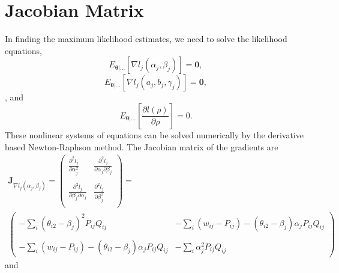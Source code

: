 \documentclass[doc]{apa7}
\begin{document}
  \section{Jacobian Matrix}
  In finding the maximum likelihood estimates, we need to solve the
  likelihood equations,
  \begin{equation}
    E_{\bm{\theta}|\dots}\left[\nabla l_j(\alpha_j, \beta_j)\right] = \bm{0},
  \end{equation}
  \begin{equation}
    E_{\bm{\theta}|\dots}\left[\nabla l_j(a_j, b_j, \gamma_j)\right] = \bm{0},
  \end{equation},
  and
  \begin{equation}
    E_{\bm{\theta}|\dots}\left[\frac{\partial l(\rho)}{\partial \rho}\right] = 0.
  \end{equation}
  These nonlinear systems of equations can be solved numerically by the
  derivative based Newton-Raphson method. The Jacobian matrix of the
  gradients are
  \begin{equation}
  \begin{gathered}
    \bm{J}_{\nabla l_j(\alpha_j, \beta_j)} = 
    \begin{pmatrix}
      \frac{\partial^2 l_j}{\partial \alpha_j^2} &  \frac{\partial^2 l_j}
      {\partial \alpha_j \partial \beta_j}\\
      \\
      \frac{\partial^2 l_j}{\partial \beta_j \partial \alpha_j} &  
      \frac{\partial^2 l_j}{\partial \beta_j^2}\\
    \end{pmatrix}=\\
    \begin{pmatrix}
      -\sum_i(\theta_{i2}-\beta_j)^2P_{ij}Q_{ij} & -\sum_i
      (w_{ij}-P_{ij})-(\theta_{i2}-\beta_j)\alpha_jP_{ij}Q_{ij}\\
      \\
      -\sum_i(w_{ij}-P_{ij}) - (\theta_{i2}-\beta_j)\alpha_jP_{ij}Q_{ij}
      & -\sum_i\alpha_j^2 P_{ij} Q_{ij}
    \end{pmatrix}
  \end{gathered}
  \end{equation}
  and
\end{document}
